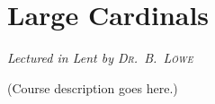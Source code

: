 \chapter[Large Cardinals \\ \textnormal{\emph{Lectured in Lent \oldstylenums{2024} by \textsc{Prof.\ B.\ L\"owe}}}]{Large Cardinals}
\emph{\Large Lectured in Lent  by \textsc{Dr.\ B.\ L\"owe}}

(Course description goes here.)


